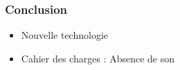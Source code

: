   \begin{frame}
   \frametitle{Conclusion}
 \begin{itemize}
    \item Nouvelle technologie
    \item Cahier des charges : Absence de son
   \end{itemize}
\end{frame}
